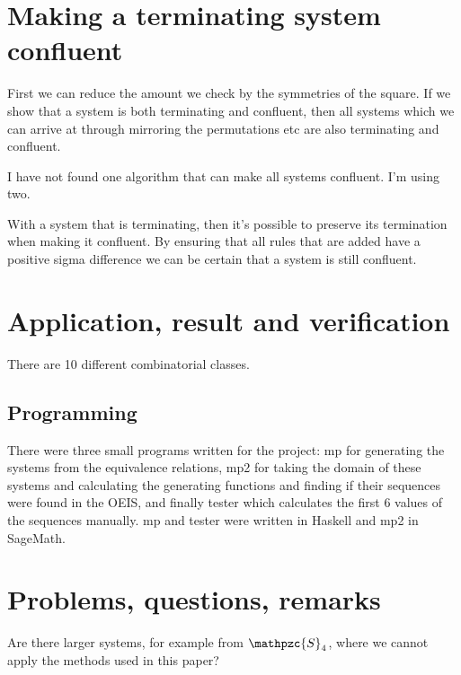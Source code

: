 \documentclass[a4paper, 11pt]{article}
\theoremstyle{definition}
\newcommand{\Sym}{\mathpzc{S}}
\begin{document}
\section{Making a terminating system confluent}
First we can reduce the amount we check by the symmetries of the square.
If we show that a system is both terminating and confluent, then all systems
which we can arrive at through mirroring the permutations etc are also
terminating and confluent.

I have not found one algorithm that can make all systems confluent.
I'm using two.

With a system that is terminating, then it's possible to preserve its
termination when making it confluent.
By ensuring that all rules that are added have a positive sigma difference
we can be certain that a system is still confluent. 


\section{Application, result and verification}
There are 10 different combinatorial classes.
\subsection{Programming}
There were three small programs written for the project: mp for generating the
systems from the equivalence relations, mp2 for taking the domain of these
systems and calculating the generating functions and finding if their sequences
were found in the OEIS, and finally tester which calculates the first 6 values
of the sequences manually. mp and tester were written in Haskell and mp2 in SageMath. 


\section{Problems, questions, remarks}
Are there larger systems, for example from $\Sym_4$, where we cannot apply the
methods used in this paper?



\end{document}
